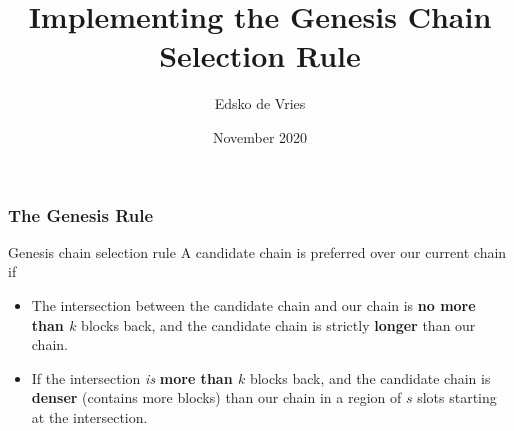 \documentclass[usenames,dvipsnames,t]{beamer}
\title{Implementing the Genesis Chain Selection Rule}
\author{Edsko de Vries}
\institute{Well-Typed}
\date{November 2020}
\begin{document}
\frame{\titlepage}


\begin{frame}
\frametitle{The Genesis Rule}

\begin{alertblock}{Genesis chain selection rule}
A candidate chain is preferred over our current chain if

\begin{itemize}
\item The intersection between the candidate chain and our chain is \textbf{no
more than $k$} blocks back, and the candidate chain is strictly \textbf{longer}
than our chain.

\item If the intersection \emph{is} \textbf{more than $k$} blocks back, and the
candidate chain is \textbf{denser} (contains more blocks) than our chain in
a region of $s$ slots starting at the intersection.
\end{itemize}
\end{alertblock}

\end{frame}

\end{document}
